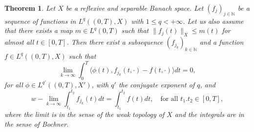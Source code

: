 \documentclass[11pt]{article}
\theoremstyle{plain}
\newtheorem{theorem}{Theorem}[section]
\theoremstyle{definition}
\theoremstyle{remark}
\numberwithin{equation}{section}
\begin{document}
\begin{theorem}\label{thm:0}
Let $X$ be a reflexive and separable Banach space. Let $(f_j)_{j \in \mathbb N}$ be a sequence of functions in $L^q((0,T),X)$ with $1\le q <+\infty$. Let us also assume
that there exists a map $m \in L^q(0,T)$ such that $\|f_j(t)\|_X \leq m(t)$ for almost all $t \in [0,T]$. Then there exist 
a subsequence $(f_{j_k})_{k \in \mathbb N}$ and a function $f \in L^q((0,T),X)$ such that 
\begin{equation}\label{weaklim}
\lim_{k \to \infty} \int_0^T \langle \phi(t), f_{j_k}(t, \cdot) -  f(t, \cdot) \rangle dt = 0,
\end{equation}
for all $\phi \in L^{q'}((0,T), X')$, with $q'$ the conjugate exponent of $q$, and
\begin{equation}\label{L1weak}
w-\lim_{k \to \infty} \int_{t_1}^{t_2} f_{j_k}(t) dt = \int_{t_1}^{t_2} f(t) dt, \quad \mbox{for all } t_1.t_2 \in [0,T],
\end{equation}
where the limit is in the sense of the weak topology of $X$ and the integrals are in the sense of Bochner.
\end{theorem}
\end{document}
